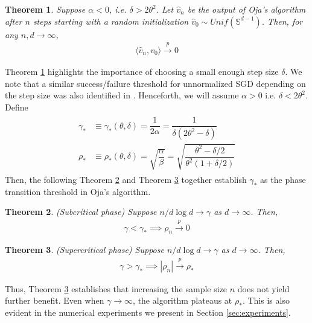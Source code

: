 \documentclass[12pt]{article}
\newtheorem{theorem}{Theorem}[section]  %
\def\sS{{\mathbb{S}}}
\begin{document}
\begin{theorem}\label{thm:alpha0}
    Suppose $\alpha<0$, i.e. $\delta > 2\theta^2$. Let $\hat v_n$ be the output of Oja's algorithm after $n$ steps starting with a random initialization $\hat v_0\sim Unif(\sS^{d-1})$. Then, for any $n,d\to\infty$,
    \begin{align*}
        \langle \hat v_n,v_0\rangle \stackrel{p}{\to}0
    \end{align*}
\end{theorem}


Theorem \ref{thm:alpha0} highlights the importance of choosing a small enough step size $\delta$. We note that a similar success/failure threshold for unnormalized SGD depending on the step size was also identified in \citet{ben2022high}. Henceforth, we will assume $\alpha > 0$ i.e. $\delta < 2\theta^2$. Define 
\begin{align}\label{eqn:rho_gamma_crit_defns}
\begin{split}
   \gamma_*&\equiv \gamma_*(\theta,\delta)=\dfrac{1}{2\alpha}=\dfrac{1}{\delta(2\theta^2-\delta)} \\
   \rho_* &\equiv \rho_*(\theta,\delta) = \sqrt{\dfrac{\alpha}{\beta}} = \sqrt{\dfrac{\theta^2-\delta/2}{\theta^2(1+\delta/2)}}    
\end{split}
\end{align}
 Then, the following Theorem \ref{thm:subcritical} and Theorem \ref{thm:supercritical} together establish $\gamma_*$ as the phase transition threshold in Oja's algorithm.

\begin{theorem}\label{thm:subcritical}(Subcritical phase)
    Suppose $n/d\log d\to \gamma$ as $d\to\infty$. Then,
    \begin{align*}
        \gamma<\gamma_*\implies \rho_n\stackrel{p}{\to}0
    \end{align*}
\end{theorem}


\begin{theorem}\label{thm:supercritical}(Supercritical phase)
    Suppose $n/d\log d\to \gamma$ as $d\to\infty$. Then,
    \begin{align*}
        \gamma>\gamma_*\implies |\rho_n|\stackrel{p}{\to}\rho_*
    \end{align*}
\end{theorem}

Thus, Theorem \ref{thm:supercritical} establishes that increasing the sample size $n$ does not yield further benefit. Even when $\gamma\to\infty$, the algorithm plateaus at $\rho_*$. This is also evident in the numerical experiments we present in Section \ref{sec:experiments}.
\end{document}
